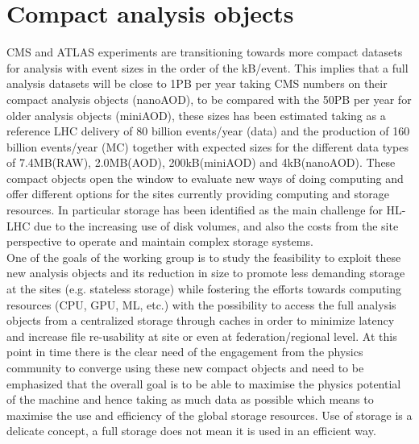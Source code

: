 \section{Compact analysis objects}
CMS and ATLAS experiments are transitioning towards more compact datasets for analysis with event sizes in the order of the kB/event. This implies that a full analysis datasets will be close to 1PB per year taking CMS numbers on their compact analysis objects (nanoAOD), to be compared with the 50PB per year for older analysis objects (miniAOD), these sizes has been estimated taking as a reference LHC delivery of 80 billion events/year (data) and the production of 160 billion events/year (MC) together with expected sizes for the different data types of 7.4MB(RAW), 2.0MB(AOD), 200kB(miniAOD) and 4kB(nanoAOD). These compact objects open the window to evaluate new ways of doing computing and offer different options for the sites currently providing computing and storage resources. In particular storage has been identified as the main challenge for HL-LHC due to the increasing use of disk volumes, and also the costs from the site perspective to operate and maintain complex storage systems.\\
One of the goals of the working group is to study the feasibility to exploit these new analysis objects and its reduction in size to promote less demanding storage at the sites (e.g. stateless storage) while fostering the efforts towards computing resources (CPU, GPU, ML, etc.) with the possibility to access the full analysis objects from a centralized storage through caches in order to minimize latency and increase file re-usability at site or even at federation/regional level. At this point in time there is the clear need of the engagement from the physics community to converge using these new compact objects and need to be emphasized that the overall goal is to be able to maximise the physics potential of the machine and hence taking as much data as possible which means to maximise the use and efficiency of the global storage resources. Use of storage is a delicate concept, a full storage does not mean it is used in an efficient way.\\
